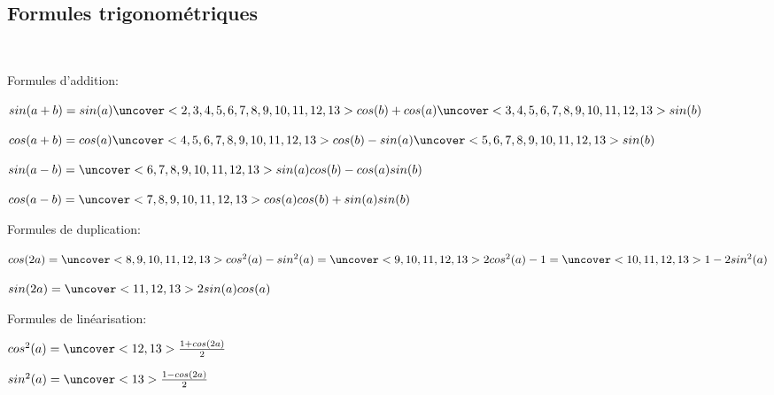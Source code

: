 \documentclass{beamer}
\theoremstyle{plain}
\begin{document}
\subsection{Formules trigonométriques}

\begin{frame}
\begin{theorem}
~

 Formules d'addition:
 
 $sin(a+b)=sin(a)\uncover<2,3,4,5,6,7,8,9,10,11,12,13>{cos(b)}+cos(a)\uncover<3,4,5,6,7,8,9,10,11,12,13>{sin(b)}$
 
 $cos(a+b)=cos(a)\uncover<4,5,6,7,8,9,10,11,12,13>{cos(b)}-sin(a)\uncover<5,6,7,8,9,10,11,12,13>{sin(b)}$
 
 $sin(a-b)=\uncover<6,7,8,9,10,11,12,13>{sin(a)cos(b)-cos(a)sin(b)}$
  
 $cos(a-b)=\uncover<7,8,9,10,11,12,13>{cos(a)cos(b)+sin(a)sin(b)}$
 \vspace{0.5cm}
 
 Formules de duplication:
 
 $cos(2a)=\uncover<8,9,10,11,12,13>{cos^2(a)-sin^2(a)}
 =\uncover<9,10,11,12,13>{2cos^2(a)-1}
 =\uncover<10,11,12,13>{1-2sin^2(a)}$
 
 $sin(2a)=\uncover<11,12,13>{2sin(a)cos(a)}$
 \vspace{0.5cm}
 
 Formules de linéarisation:
 
 $cos^2(a)=\uncover<12,13>{\frac{1+cos(2a)}{2}}$
 
 $sin^2(a)=\uncover<13>{\frac{1-cos(2a)}{2}}$
\end{theorem}
\end{frame}

   
 
  
\end{document}

